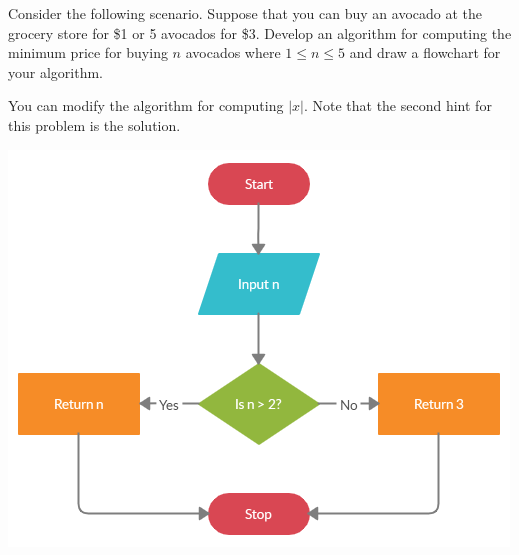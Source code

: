 \documentclass{ximera}
\begin{document}
\begin{problem}
	Consider the following scenario. Suppose that you can buy an avocado at the grocery store for \$1 or 5 avocados for \$3. Develop an algorithm for computing the minimum price for buying $n$ avocados where $1\leq n\leq 5$ and draw a flowchart for your algorithm.
	\begin{hint}
		You can modify the algorithm for computing $|x|$. Note that the second hint for this problem is the solution.
	\end{hint}
	\begin{hint}
		\begin{center}
			\includegraphics{avocados.png}
		\end{center}
	\end{hint}
\end{problem}
\end{document}
